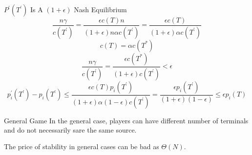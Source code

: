 \documentclass[11pt,aspectratio=169]{beamer}
\begin{document}
\begin{frame}{$P^{'}(T^{'})$ Is A $(1+\epsilon)$ Nash Equilibrium}
    \[\frac{n\gamma}{c(T^{'})} = \frac{\epsilon c(T) n}{(1+\epsilon)n\alpha c(T^{'})} = \frac{\epsilon c(T) }{(1+\epsilon)\alpha c(T^{'})}\]
    \[c(T) = \alpha c(T^*)\]
    \[\frac{n\gamma}{c(T^{'})} = \frac{\epsilon c(T^*)}{(1+\epsilon)c(T^{'})} < \epsilon\]
    \[p_i^{'}(T^{'}) - p_i(T^{'}) \leq \frac{\epsilon c(T) p_i(T^{'}) }{(1+\epsilon)\alpha (1-\epsilon) c(T^{'}) } = \frac{\epsilon  p_i(T^{'}) }{(1+\epsilon) (1-\epsilon) } \leq \epsilon p_i(T)\]
\end{frame}


\begin{frame}{General Game}
    In the general case, players can have different number of terminals and do not necessarily sare the same source.
    
    \begin{lemma}
        The price of stability in general cases can be bad as $\Theta(N)$.
    \end{lemma}
\end{frame}
\end{document}
